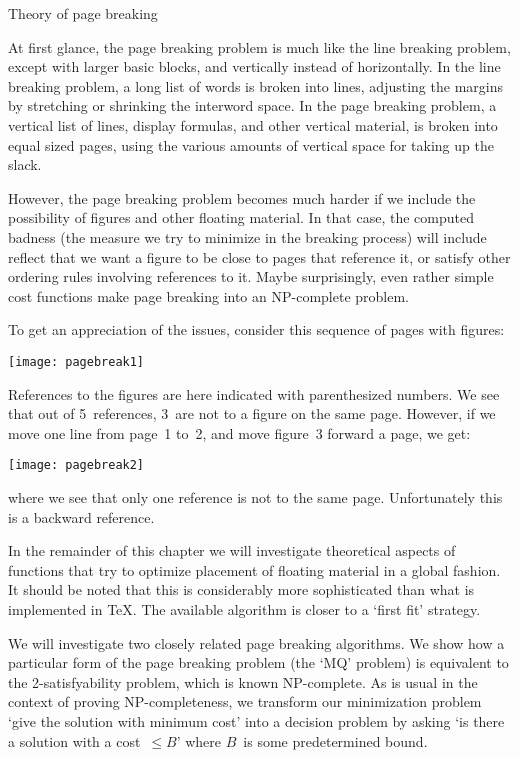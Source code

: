  {Theory of page breaking}
\label{sec:np-page}

At first glance, the page breaking problem is much like the line
breaking problem, except with larger basic blocks, and vertically
instead of horizontally. In the line breaking problem, a long list of
words is broken into lines, adjusting the margins by stretching or
shrinking the interword space. In the page breaking problem, a
vertical list of lines, display formulas, and other vertical material,
is broken into equal sized pages, using the various amounts of
vertical space for taking up the slack.

However, the page breaking problem becomes much harder if we include
the possibility of figures and other floating material. In that case,
the computed badness (the measure we try to minimize in the breaking
process) will include reflect that we want a figure to be close to
pages that reference it, or satisfy other ordering rules involving
references to it. Maybe surprisingly, even rather simple cost
functions make page breaking into an NP-complete problem.

To get an appreciation of the issues, consider this sequence of pages
with figures:

\texttt{[image: pagebreak1]}

References to the figures are here indicated with parenthesized
numbers. We see that out of 5~references, 3~are not to a figure on the
same page. However, if we move one line from page~1 to~2, and move
figure~3 forward a page, we get:

\texttt{[image: pagebreak2]}

where we see that only one reference is not to the same
page. Unfortunately this is a backward reference.

In the remainder of this chapter we will investigate theoretical
aspects of functions that try to optimize placement of floating
material in a global fashion. It should be noted that this is
considerably more sophisticated than what is implemented in \TeX. The
available algorithm is closer to a `first fit' strategy.

We will investigate two closely related page breaking
algorithms.
We show how a particular form of the page breaking
problem (the `MQ' problem)
is equivalent to the 2-satisfyability problem, which is known
NP-complete. As is usual in the context of proving NP-completeness, we
transform our minimization problem `give the solution with minimum
cost' into a decision problem by asking
`is there a solution with a cost~$\leq B$' where $B$~is some
predetermined bound.

